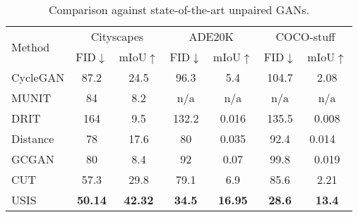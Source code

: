 \documentclass{article}
\begin{document}
\begin{table}




	\setlength{\tabcolsep}{0.2em}
	\renewcommand{\arraystretch}{0.95}
	\centering
	
	\begin{tabular}{l|cc|cc|cc}
    	\multirow{2}{*}{\normalsize{} Method } & \multicolumn{2}{c|}{\normalsize{} Cityscapes} &  \multicolumn{2}{c|}{\normalsize{} ADE20K} & \multicolumn{2}{c}{\normalsize{} COCO-stuff} 
    	\tabularnewline
    	  &  \normalsize{} FID$\downarrow$  & \normalsize{} mIoU$\uparrow$ &  \normalsize{} FID$\downarrow$  & \normalsize{} mIoU$\uparrow$ &  \normalsize{} FID$\downarrow$  & \normalsize{} mIoU$\uparrow$ \tabularnewline
    	
    	\hline 
    	
    	{\small{CycleGAN} \cite{zhu2017unpaired} } &   \normalsize{87.2} & \normalsize{24.5}  &  \normalsize{96.3} & \normalsize{5.4} &  \normalsize{104.7} & \normalsize{2.08} \tabularnewline
    	
    	
    	
    	{\small{MUNIT} \cite{huang2018multimodal}  } &   \normalsize{84} & \normalsize{8.2} &   \normalsize{n/a} & \normalsize{n/a}  &  \normalsize{n/a} & \normalsize{n/a} \tabularnewline
    	
    	
    	{\small{DRIT} \cite{lee2018diverse}  } &  \normalsize{164} & \normalsize{9.5} &  \normalsize{132.2} & \normalsize{0.016} &  \normalsize{135.5} & \normalsize{0.008} \tabularnewline
		
				
    	 {\small{Distance} \cite{benaim2017one}  } &   \normalsize{78} & \normalsize{17.6} &  \normalsize{80} & \normalsize{0.035} &  \normalsize{92.4} & \normalsize{0.014 } \ \tabularnewline
    		
    		
    		
    	{\small{GCGAN} \cite{fu2019geometry} } &   \normalsize{80} & \normalsize{8.4} &   \normalsize{92} & \normalsize{0.07} &  \normalsize{99.8} & \normalsize{0.019} \tabularnewline
    		
    	
    	\small{CUT} \cite{park2020cut} &   
    	\normalsize{57.3} & \normalsize{29.8} &  \normalsize{79.1}  &\normalsize{6.9} &  \normalsize{85.6} & \normalsize{2.21}  \tabularnewline


    	 \hline
    	
    	\small{} USIS	&   \normalsize{\textbf{50.14}} & \normalsize{\textbf{42.32}} & \normalsize{\textbf{34.5}} & \normalsize{\textbf{16.95}} & \normalsize{\textbf{28.6}} & \normalsize{\textbf{13.4}} \tabularnewline
		
		\end{tabular}
	\caption{Comparison against state-of-the-art unpaired GANs.}
	\label{table:comp_with_sota}
	\vspace{-1.5em}
\end{table}
\end{document}
